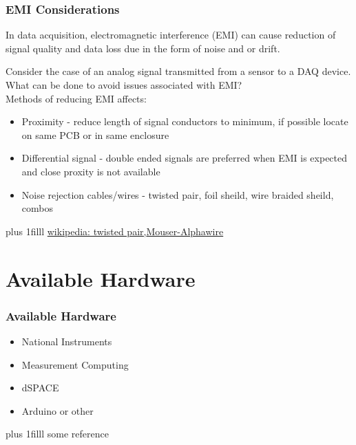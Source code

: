 \documentclass[fleqn]{beamer} %
\newcommand{\sectiontitleII}{EMI Considerations}
\newcommand{\sectiontitleIII}{Available Hardware}
\newcommand{\btVFill}{\vskip0pt plus 1filll}
\begin{document}
\begin{frame}[label=sectionII] \scriptsize
\frametitle{\sectiontitleII}
\bigskip

	In data acquisition, electromagnetic interference (EMI) can cause reduction of signal quality and data loss due in the form of {\BR noise} and or {\GR drift}. \vspace{10mm}

	Consider the case of an analog signal transmitted from a sensor to a DAQ device. What can be done to avoid issues associated with EMI?  \vspace{5mm}\\

	Methods of reducing EMI affects:
	\begin{itemize}
		\item Proximity - reduce length of signal conductors to minimum, if possible locate on same PCB or in same enclosure

		\item Differential signal - double ended signals are preferred when EMI is expected and close proxity is not available 

		\item Noise rejection cables/wires - twisted pair, foil sheild, wire braided sheild, combos 

	\end{itemize}


	\btVFill
	\tiny{\href{https://en.wikipedia.org/wiki/Twisted_pair}{wikipedia: twisted pair,}\href{https://www.mouser.com/pdfdocs/alphawire-Understanding-Shielded-Cable.pdf}{Mouser-Alphawire}}		

\end{frame}



\section{\sectiontitleIII}	

\begin{frame}[label=sectionIII] \small
\frametitle{\sectiontitleIII}
\bigskip

\begin{itemize}
	\item National Instruments \vspace{6mm}\\
	
	\item Measurement Computing  \vspace{6mm}\\
	
	\item dSPACE  \vspace{6mm}\\
	
	\item Arduino or other 
	
\end{itemize}

\btVFill
\tiny{some reference}		

\end{frame}
	
\end{document}
